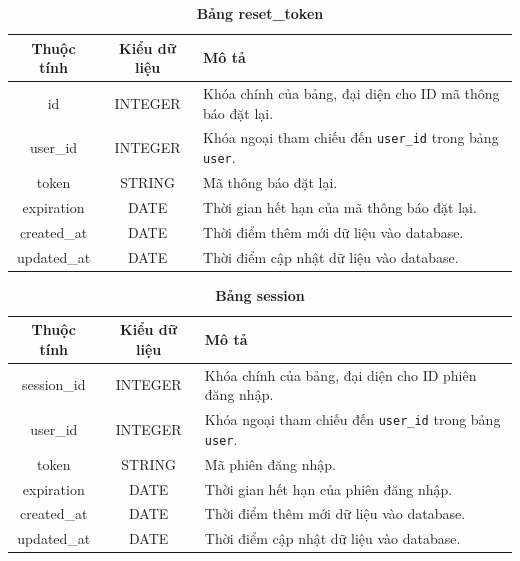 \begin{table}[H]
  \caption{\bfseries \fontsize{12pt}{0pt}\selectfont Bảng reset\_token}
  \centering
  \begin{tabularx}{0.9\textwidth}{|c|c|X|}
    \hline
    \textbf{Thuộc tính} & \textbf{Kiểu dữ liệu} & \textbf{Mô tả} \\
    \hline
    id & INTEGER & Khóa chính của bảng, đại diện cho ID mã thông báo đặt lại. \\
    \hline
    user\_id & INTEGER & Khóa ngoại tham chiếu đến \texttt{user\_id} trong bảng \texttt{user}. \\
    \hline
    token & STRING & Mã thông báo đặt lại. \\
    \hline
    expiration & DATE & Thời gian hết hạn của mã thông báo đặt lại. \\
    \hline
    created\_at & DATE & Thời điểm thêm mới dữ liệu vào database. \\
    \hline
    updated\_at & DATE & Thời điểm cập nhật dữ liệu vào database. \\
    \hline
  \end{tabularx}
\end{table}


\begin{table}[H]
  \caption{\bfseries \fontsize{12pt}{0pt}\selectfont Bảng session}
  \centering
  \begin{tabularx}{0.9\textwidth}{|c|c|X|}
    \hline
    \textbf{Thuộc tính} & \textbf{Kiểu dữ liệu} & \textbf{Mô tả} \\
    \hline
    session\_id & INTEGER & Khóa chính của bảng, đại diện cho ID phiên đăng nhập. \\
    \hline
    user\_id & INTEGER & Khóa ngoại tham chiếu đến \texttt{user\_id} trong bảng \texttt{user}. \\
    \hline
    token & STRING & Mã phiên đăng nhập. \\
    \hline
    expiration & DATE & Thời gian hết hạn của phiên đăng nhập. \\
    \hline
    created\_at & DATE & Thời điểm thêm mới dữ liệu vào database. \\
    \hline
    updated\_at & DATE & Thời điểm cập nhật dữ liệu vào database. \\
    \hline
  \end{tabularx}
\end{table}

